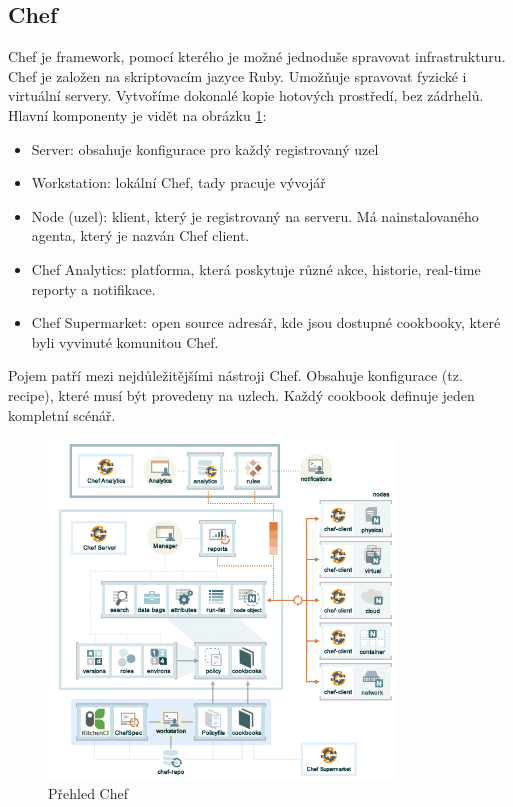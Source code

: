 \subsection{Chef}
Chef je framework, pomocí kterého je možné jednoduše spravovat infrastrukturu. Chef je založen na skriptovacím jazyce Ruby. Umožňuje spravovat fyzické i virtuální servery. Vytvoříme dokonalé kopie hotových prostředí, bez zádrhelů. Hlavní komponenty je vidět na obrázku \ref{fig:chefoverview}:

\begin{itemize}
\item Server: obsahuje konfigurace pro každý registrovaný uzel
\item Workstation: lokální Chef, tady pracuje vývojář
\item Node (uzel): klient, který je registrovaný na serveru. Má nainstalovaného agenta, který je nazván Chef client.
\item Chef Analytics: platforma, která poskytuje různé akce, historie, real-time reporty a notifikace.
\item Chef Supermarket: open source adresář, kde jsou dostupné cookbooky, které byli vyvinuté komunitou Chef.
\end{itemize}

Pojem  patří mezi nejdůležitějšími nástroji Chef. Obsahuje konfigurace (tz. recipe), které musí být provedeny na uzlech. Každý cookbook definuje jeden kompletní scénář. \cite{ChefHandsOnLab}

\begin{figure}[]
  \centering
  \includegraphics[height=9cm]{fig/chef_overview.png}
  \caption{Přehled Chef}
  \label{fig:chefoverview}
\end{figure}

